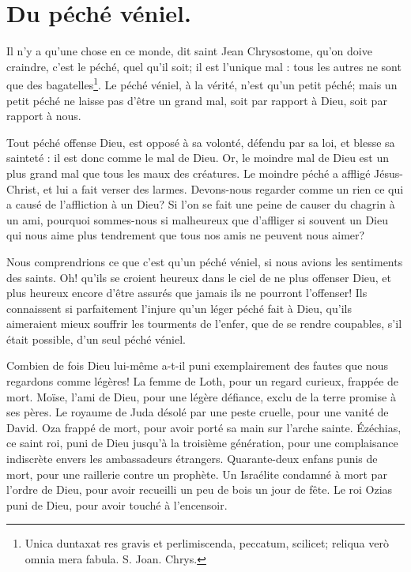 \documentclass[instructions.tex]{subfiles}
\begin{document}
\chapter{Du péché véniel.}


Il n'y a qu'une chose en ce monde, dit saint Jean Chrysostome, qu'on doive craindre, c'est le péché, quel qu'il soit; il est l'unique mal : tous les autres ne sont que des bagatelles\footnote{Unica duntaxat res gravis et perlimiscenda, peccatum, scilicet; reliqua verò omnia mera fabula. S. Joan. Chrys.}. Le péché véniel, à la vérité, n'est qu'un petit péché; mais un petit péché ne laisse pas d'être un grand mal, soit par rapport à Dieu, soit par rapport à nous.

\primo Tout péché offense Dieu, est opposé à sa volonté, défendu par sa loi, et blesse sa sainteté : il est donc comme le mal de Dieu. Or, le moindre mal de Dieu est un plus grand mal que tous les maux des créatures. Le moindre péché a affligé Jésus-Christ, et lui a fait verser des larmes. Devons-nous regarder comme un rien ce qui a causé de l'affliction à un Dieu? Si l'on se fait une peine de causer du chagrin à un ami, pourquoi sommes-nous si malheureux que d'affliger si souvent un Dieu qui nous aime plus tendrement que tous nos amis ne peuvent nous aimer?

Nous comprendrions ce que c'est qu'un péché véniel, si nous avions les sentiments des saints. Oh! qu'ils se croient heureux dans le ciel de ne plus offenser Dieu, et plus heureux encore d'être assurés que jamais ils ne pourront l'offenser! Ils connaissent si parfaitement l'injure qu'un léger péché fait à Dieu, qu'ils aimeraient mieux souffrir les tourments de l'enfer, que de se rendre coupables, s'il était possible, d'un seul péché véniel.

Combien de fois Dieu lui-même a-t-il puni exemplairement des fautes que nous regardons comme légères! La femme de Loth, pour un regard curieux, frappée de mort. Moïse, l'ami de Dieu, pour une légère défiance, exclu de la terre promise à ses pères. Le royaume de Juda désolé par une peste cruelle, pour une vanité de David. Oza frappé de mort, pour avoir porté sa main sur l'arche sainte. Ézéchias, ce saint roi, puni de Dieu jusqu'à la troisième génération, pour une complaisance indiscrète envers les ambassadeurs étrangers. Quarante-deux enfans punis de mort, pour une raillerie contre un prophète. Un Israélite condamné à mort par l'ordre de Dieu, pour avoir recueilli un peu de bois un jour de fête. Le roi Ozias puni de Dieu, pour avoir touché à l'encensoir.
\end{document}
